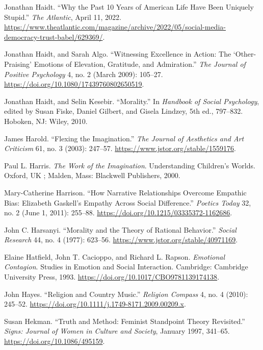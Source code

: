 \documentclass[phdthesis,12pt,final,a4paper]{wuthesis}
\newlength{\cslhangindent}
\newenvironment{CSLReferences}[2] %
{\begin{list}{}{%
	\setlength{\itemindent}{0pt}
	\setlength{\leftmargin}{0pt}
	\setlength{\parsep}{0pt}
	\ifodd #1
	\setlength{\leftmargin}{\cslhangindent}
	\setlength{\itemindent}{-1\cslhangindent}
	\fi
	\setlength{\itemsep}{#2\baselineskip}}}
{\end{list}}
\theoremstyle{definition}
\theoremstyle{definition}
\theoremstyle{definition}
\theoremstyle{definition}
\theoremstyle{remark}
\begin{document}
\begin{CSLReferences}{1}{0}
Jonathan Haidt. {``Why the {Past} 10 {Years} of {American Life Have Been Uniquely Stupid}.''} \emph{The Atlantic}, April 11, 2022. \url{https://www.theatlantic.com/magazine/archive/2022/05/social-media-democracy-trust-babel/629369/}.

Jonathan Haidt, and Sarah Algo. {``Witnessing {Excellence} in {Action}: {The} {`{Other-Praising}'} {Emotions} of {Elevation}, {Gratitude}, and {Admiration}.''} \emph{The Journal of Positive Psychology} 4, no. 2 (March 2009): 105--27. \url{https://doi.org/10.1080/17439760802650519}.

Jonathan Haidt, and Selin Kesebir. {``Morality.''} In \emph{Handbook of Social Psychology}, edited by Susan Fiske, Daniel Gilbert, and Gisela Lindzey, 5th ed., 797--832. Hoboken, NJ: Wiley, 2010.

James Harold. {``Flexing the {Imagination}.''} \emph{The Journal of Aesthetics and Art Criticism} 61, no. 3 (2003): 247--57. \url{https://www.jstor.org/stable/1559176}.

Paul L. Harris. \emph{The {Work} of the {Imagination}}. Understanding {Children}'s {Worlds}. Oxford, UK ; Malden, Mass: Blackwell Publishers, 2000.

Mary-Catherine Harrison. {``How {Narrative Relationships Overcome Empathic Bias}: {Elizabeth Gaskell}'s {Empathy} Across {Social Difference}.''} \emph{Poetics Today} 32, no. 2 (June 1, 2011): 255--88. \url{https://doi.org/10.1215/03335372-1162686}.

John C. Harsanyi. {``Morality and the {Theory} of {Rational Behavior}.''} \emph{Social Research} 44, no. 4 (1977): 623--56. \url{https://www.jstor.org/stable/40971169}.

Elaine Hatfield, John T. Cacioppo, and Richard L. Rapson. \emph{Emotional {Contagion}}. Studies in {Emotion} and {Social Interaction}. Cambridge: Cambridge University Press, 1993. \url{https://doi.org/10.1017/CBO9781139174138}.

John Hayes. {``Religion and {Country Music}.''} \emph{Religion Compass} 4, no. 4 (2010): 245--52. \url{https://doi.org/10.1111/j.1749-8171.2009.00209.x}.

Susan Hekman. {``Truth and Method: {Feminist} Standpoint Theory Revisited.''} \emph{Signs: Journal of Women in Culture and Society}, January 1997, 341--65. \url{https://doi.org/10.1086/495159}.


\end{CSLReferences}
\end{document}
